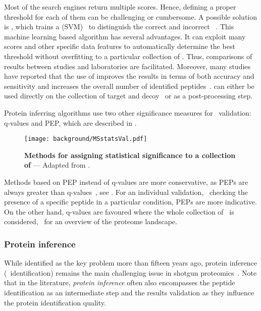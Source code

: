 Most of the search engines return multiple scores.
Hence, defining a proper threshold for each of them can be challenging or cumbersome.
A possible solution is ,
which trains a  (\gls{SVM})~
to distinguish the correct and incorrect \psms{}~.
This machine learning based algorithm has several advantages.
It can exploit many scores and other specific data features
to automatically determine the best threshold
without overfitting to a particular collection of \psms.
Thus, comparisons of results between studies and laboratories are facilitated.
Moreover, many studies have reported that the use of 
improves the results in terms of both accuracy and sensitivity and
increases the overall number of identified peptides~.
 can either be used directly on
the collection of target and decoy \psms\
or as a post-processing step.\mybr\

Protein inferring algorithms use
two other significance measures for \psm\ validation:
q-values and \gls{PEP},
which are described in .\mybr\

\begin{figure}[!htbp]
    \texttt{[image: background/MSstatsVal.pdf]}\centering
    \vspace{-3mm}
    \caption[Methods for assigning statistical significance]{\label{fig:MSstatval}%
    \textbf{Methods for assigning statistical significance to a collection of \psms}
   --- Adapted from \mycite{Kall2008-tf}.}
\end{figure}

Methods based on \gls{PEP} instead of q-values are more conservative,
as \glspl{PEP} are always greater than q-values~\mycite{Kall2008-tf},
see \Cref{fig:MSstatval}.
For an individual validation,
\eg\ checking the presence of a specific peptide in a particular condition,
\glspl{PEP} are more indicative.
On the other hand, q-values are favoured
where the whole collection of \psms\ is considered,
\eg\ for an overview of the proteome landscape.~\mybr\

\subsubsection{Protein inference}\label{subsec:proteinInference}

While identified as the key problem more than fifteen years ago,
protein inference (\ie\ identification) remains
the main challenging issue in shotgun proteomics~.
Note that in the literature,
\emph{protein inference} often also encompasses
the peptide identification as an intermediate step
and the results validation
as they influence the protein identification quality.\mybr\

